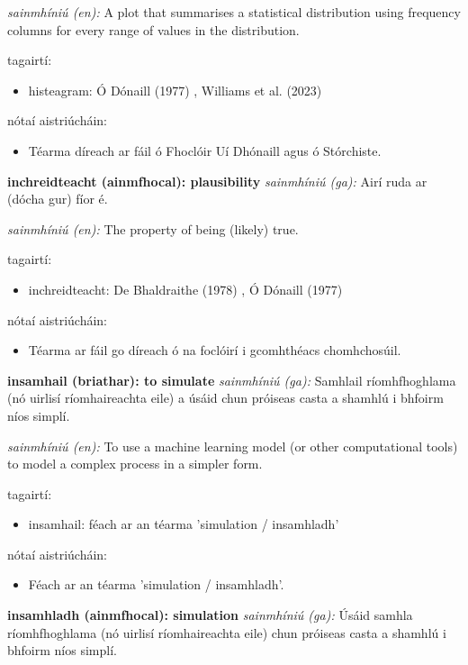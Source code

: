 \documentclass{article}
\begin{document}
\textit{sainmhíniú (en):} A plot that summarises a statistical distribution using frequency columns for every range of values in the distribution.

tagairtí:
\begin{itemize}
	\item histeagram: Ó Dónaill (1977) \cite{odonaill}, Williams et al. (2023) \cite{storchiste}
\end{itemize}

nótaí aistriúcháin:
\begin{itemize}
	\item Téarma díreach ar fáil ó Fhoclóir Uí Dhónaill agus ó Stórchiste.
\end{itemize}


\textbf{inchreidteacht (ainmfhocal): plausibility}
\textit{sainmhíniú (ga):} Airí ruda ar (dócha gur) fíor é.

\textit{sainmhíniú (en):} The property of being (likely) true.

tagairtí:
\begin{itemize}
	\item inchreidteacht: De Bhaldraithe (1978) \cite{de-bhaldraithe}, Ó Dónaill (1977) \cite{odonaill}
\end{itemize}

nótaí aistriúcháin:
\begin{itemize}
	\item Téarma ar fáil go díreach ó na foclóirí i gcomhthéacs chomhchosúil.
\end{itemize}


\textbf{insamhail (briathar): to simulate}
\textit{sainmhíniú (ga):} Samhlail ríomhfhoghlama (nó uirlisí ríomhaireachta eile) a úsáid chun próiseas casta a shamhlú i bhfoirm níos simplí.

\textit{sainmhíniú (en):} To use a machine learning model (or other computational tools) to model a complex process in a simpler form.

tagairtí:
\begin{itemize}
	\item insamhail: féach ar an téarma 'simulation / insamhladh'
\end{itemize}

nótaí aistriúcháin:
\begin{itemize}
	\item Féach ar an téarma 'simulation / insamhladh'.
\end{itemize}


\textbf{insamhladh (ainmfhocal): simulation}
\textit{sainmhíniú (ga):} Úsáid samhla ríomhfhoghlama (nó uirlisí ríomhaireachta eile) chun próiseas casta a shamhlú i bhfoirm níos simplí.
\end{document}
